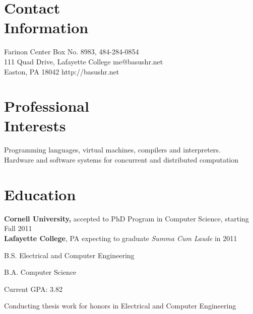 \documentclass[margin,line]{resume}
\begin{document}
\begin{resume}


    \section{Contact\\Information}

    Farinon Center Box No. 8983,              \hfill 484-284-0854            \\
    111 Quad Drive, Lafayette College         \hfill me@basushr.net          \\
    Easton, PA 18042                          \hfill http://basushr.net

    \section{Professional\\Interests}

    Programming languages, virtual machines, compilers and interpreters. \\
    Hardware and software systems for concurrent and distributed computation 

    \section{Education}

    {\bf Cornell University,} accepted to PhD Program in Computer Science,
    starting Fall 2011 \\
    {\bf Lafayette College}, PA \vspace{2mm} expecting to graduate \emph{Summa Cum Laude} in 2011%
    \begin{list2}
        \item B.S. Electrical and Computer Engineering
        \item B.A. Computer Science
        \item Current GPA: 3.82
        \item Conducting thesis work for honors in Electrical and Computer Engineering
    \end{list2}

\end{resume}
\end{document}
